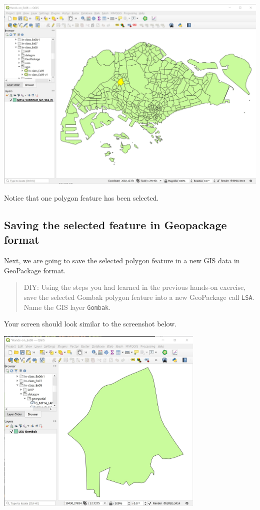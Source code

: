 \documentclass[
  letterpaper,
  DIV=11,
  numbers=noendperiod]{scrreprt}
\begin{document}
\includegraphics{./img07/image8.jpg}

Notice that one polygon feature has been selected.

\hypertarget{saving-the-selected-feature-in-geopackage-format}{%
\subsection{Saving the selected feature in Geopackage
format}\label{saving-the-selected-feature-in-geopackage-format}}

Next, we are going to save the selected polygon feature in a new GIS
data in GeoPackage format.

\begin{quote}
DIY: Using the steps you had learned in the previous hands-on exercise,
save the selected Gombak polygon feature into a new GeoPackage call
\texttt{LSA}. Name the GIS layer \texttt{Gombak}.
\end{quote}

Your screen should look similar to the screenshot below.

\includegraphics[width=0.75\textwidth,height=\textheight]{./img07/image9.jpg}
\end{document}
